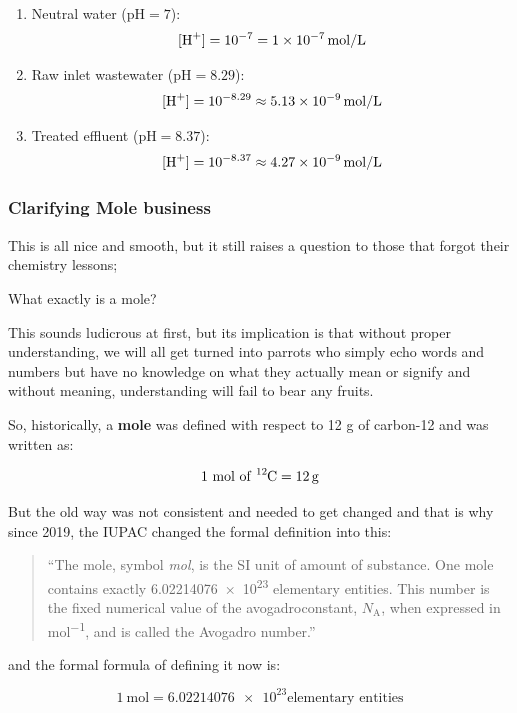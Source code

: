 \begin{enumerate}
  \item Neutral water (\(\mathrm{pH}=7\)):
  \[
    [\ce{H+}] = 10^{-7} = \SI{1e-7}{mol/L}
  \]
  
  \item Raw inlet wastewater (\(\mathrm{pH}=8.29\)):
  \[
    [\ce{H+}] = 10^{-8.29} \approx \SI{5.13e-9}{mol/L}
  \]
  
  \item Treated effluent (\(\mathrm{pH}=8.37\)):
  \[
    [\ce{H+}] = 10^{-8.37} \approx \SI{4.27e-9}{mol/L}
  \]
\end{enumerate}

\subsubsection{Clarifying Mole business}
This is all nice and smooth, but it still raises a question to those that forgot their chemistry lessons;

What exactly is a mole?

This sounds ludicrous at first, but its implication is that without proper understanding, we will all get turned into parrots who simply echo words and numbers but have no knowledge on what they actually mean or signify and without meaning, understanding will fail to bear any fruits.

So, historically, a \textbf{mole} was defined with respect to 12 g of carbon-12 \cite{lumenlearning_mole_old} and was written as:

\[
1\ \text{mol of } \ce{^{12}C} = \SI{12}{g}
\]


But the old way was not consistent and needed to get changed and that is why since 2019, the \gls{IUPAC} changed the formal definition into this:

\begin{quote}
    \enquote{The mole, symbol \textit{mol}, is the SI unit of amount of substance. One mole contains exactly \num{6.02214076e23} elementary entities. This number is the fixed numerical value of the \gls{avogadroconstant}, \( N_\mathrm{A} \), when expressed in \si{mol^{-1}}, and is called the Avogadro number.} \cite{iupac_mole_new}
\end{quote}

and the formal formula of defining it now is:

\begin{equation}
1\ \mathrm{mol} = \num{6.02214076e23} \text{elementary entities}
\end{equation}


